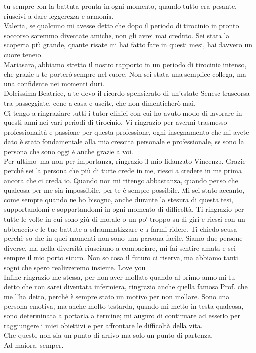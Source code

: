 tu sempre con la battuta pronta in ogni momento, quando tutto era pesante, riuscivi a dare leggerezza e armonia.\\
Valeria, se qualcuno mi avesse detto che dopo il periodo di tirocinio in pronto soccorso saremmo diventate amiche, 
non gli avrei mai creduto. Sei stata la scoperta più grande, quante risate mi hai fatto fare in questi mesi, 
hai davvero un cuore tenero.\\
Mariasara, abbiamo stretto il nostro rapporto in un periodo di tirocinio intenso, che grazie a te porterò sempre 
nel cuore. Non sei stata una semplice collega, ma una confidente nei momenti duri.\\
Dolcissima Beatrice, a te devo il ricordo spensierato di un'estate Senese trascorsa tra passeggiate, cene a casa e 
uscite, che non dimenticherò mai.\\
Ci tengo a ringraziare tutti i tutor clinici con cui ho avuto modo di lavorare in questi anni nei vari periodi di 
tirocinio. Vi ringrazio per avermi trasmesso professionalità e passione per questa professione, ogni insegnamento 
che mi avete dato è stato fondamentale alla mia crescita personale e professionale, se sono la persona che sono 
oggi è anche grazie a voi.\\
Per ultimo, ma non per importanza, ringrazio il mio fidanzato Vincenzo. 
Grazie perché sei la persona che più di tutte crede in me, riesci a credere in me prima ancora che ci 
creda io. Quando non mi ritengo abbastanza, quando penso che qualcosa per me sia impossibile, per te è sempre possibile. 
Mi sei stato accanto, come sempre quando ne ho bisogno, anche durante la stesura di questa tesi, supportandomi e sopportandomi 
in ogni momento di difficoltà. Ti ringrazio per tutte le volte in cui sono giù di 
morale o un po' troppo su di giri e riesci con un abbraccio e le tue battute a sdrammatizzare 
e a farmi ridere. Ti chiedo scusa perchè so che in quei momenti non sono una persona facile.
Siamo due persone diverse, ma nella diversità riusciamo a combaciare, mi fai sentire amata e sei sempre il mio porto sicuro. 
Non so cosa il futuro ci riserva, ma abbiamo tanti sogni che spero realizzeremo insieme. 
Love you.\\
Infine ringrazio me stessa, per non aver mollato quando al primo anno mi fu detto che non sarei diventata infermiera, 
ringrazio anche quella famosa Prof. che me l’ha detto, perchè è sempre stato un motivo per non mollare. 
Sono una persona emotiva, ma anche molto testarda, quando mi metto in testa qualcosa, sono determinata a portarla a termine; 
mi auguro di continuare ad esserlo per raggiungere i miei obiettivi e per affrontare le difficoltà della vita.\\ 
Che questo non sia un punto di arrivo ma solo un punto di partenza.\\ 
Ad maiora, semper. 


